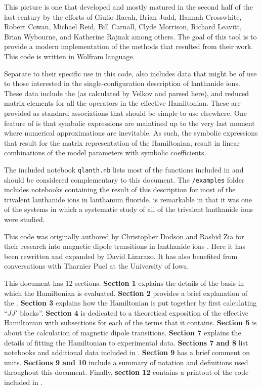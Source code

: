 \documentclass{article}
\newcommand{\codetext}[1]{{\color{BlueViolet} \texttt{#1}}}
\begin{document}
This picture is one that developed and mostly matured in the second half of the last century by the efforts of Giulio Racah, Brian Judd, Hannah Crosswhite, Robert Cowan, Michael Reid, Bill Carnall, Clyde Morrison, Richard Leavitt, Brian Wybourne, and Katherine Rajnak among others. The goal of this tool is to provide a modern implementation of the methods that resulted from their work. This code is written in Wolfram language.

Separate to their specific use in this code, \qlanth also includes data that might be of use to those interested in the single-configuration description of lanthanide ions. These data include the \cfps (as calculated by Velkov and parsed here), and reduced matrix elements for all the operators in the effective Hamiltonian. These are provided as standard \mathematica associations that should be simple to use elsewhere. One feature of \qlanth is that symbolic expressions are maintined up to the very last moment where numerical approximations are inevitable. As such, the symbolic expressions that result for the matrix representation of the Hamiltonian, result in linear combinations of the model parameters with symbolic coefficients.

The included \mathematica notebook \codetext{qlanth.nb} lists most of the functions included in \qlanth and should be considered complementary to this document. The \codetext{/examples} folder includes notebooks containing the result of this description for most of the trivalent lanthanide ions in lanthanum fluoride. \LaFthree is remarkable in that it was one of the systems in which a systematic study \cite{carnall_systematic_1989} of all of the trivalent lanthanide ions were studied.

This code was originally authored by Christopher Dodson and Rashid Zia for their research into magnetic dipole transitions in lanthanide ions \cite{dodson_magnetic_2012}. Here it has been rewritten and expanded by David Lizarazo. It has also benefited from conversations with Tharnier Puel at the University of Iowa.

This document has 12 sections. \textbf{Section 1} explains the details of the basis in which the Hamiltonian is evaluated. \textbf{Section 2} provides a brief explanation of the \cfps. \textbf{Section 3} explains how the Hamiltonian is put together by first calculating ``$JJ'$ blocks''. \textbf{Section 4} is dedicated to a theoretical exposition of the effective Hamiltonian with subsections for each of the terms that it contains. \textbf{Section 5} is about the calculation of magnetic dipole transitions. \textbf{Section 7} explains the details of fitting the Hamiltonian to experimental data. \textbf{Sections 7 and 8} list notebooks and additional data included in \qlanth. \textbf{Section 9} has a brief comment on units. \textbf{Sections 9 and 10} include a summary of notation and definitions used throughout this document. Finally, \textbf{section 12} contains a printout of the code included in \qlanth.
\end{document}
